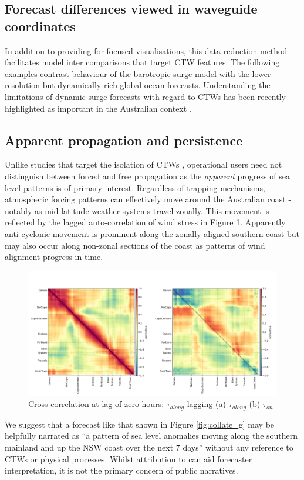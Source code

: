 \subsection{Forecast differences viewed in waveguide coordinates}

In addition to providing for focused visualisations, this data reduction method facilitates model inter comparisons that target CTW features.
The following examples contrast behaviour of the barotropic surge model with the lower resolution but dynamically rich global ocean forecasts.
Understanding the limitations of dynamic surge forecasts with regard to CTWs has been recently highlighted as important in the Australian context \citep{Hetzel:2018hh}.   


\subsection{Apparent propagation and persistence}
Unlike studies that target the isolation of CTWs \citep{Maiwa:2010tk}, operational users need not distinguish between forced and free propagation as the \emph{apparent} progress of sea level patterns is of primary interest.
Regardless of trapping mechanisms, atmospheric forcing patterns can effectively move around the Australian coast - notably as mid-latitude weather systems travel zonally. 
This movement is reflected by the lagged auto-correlation of wind stress in Figure \ref{fig:Clag0U}.
Apparently anti-cyclonic movement is prominent along the zonally-aligned southern coast but may also occur along non-zonal sections of the coast as patterns of wind alignment progress in time. 
\begin{figure}[H]\centering
    \noindent\includegraphics[width=\figwidthBig]{figures/plots/concatC_U_gstr_lag_000.png}
    \caption[Cross-correlation at lag of zero hours $\tau_{along}$]{
             Cross-correlation at lag of zero hours: 
             $\tau_{along}$ lagging (a) $\tau_{along}$ (b) $\tau_{on}$}
    \label{fig:Clag0U}
\end{figure}
We suggest that a forecast like that shown in Figure \ref{fig:collate_g} may be helpfully narrated as ``a pattern of sea level anomalies moving along the southern mainland and up the NSW coast over the next 7 days'' without any reference to CTWs or physical processes.
Whilst attribution to can aid forecaster interpretation, it is not the primary concern of public narratives.   
 
